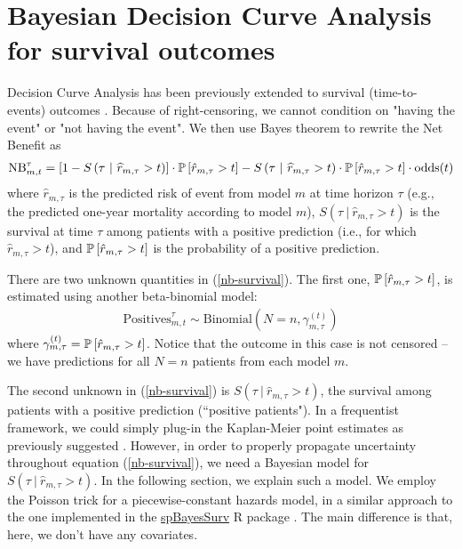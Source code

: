 \documentclass{article}
\begin{document}
\section{Bayesian Decision Curve Analysis for survival outcomes}

Decision Curve Analysis has been previously extended to survival (time-to-events) outcomes \cite{Vickers_2008}. Because of
right-censoring, we cannot condition on "having the event" or "not having the event". We then use Bayes theorem to rewrite the
Net Benefit as
\begin{align}
    \textrm{NB}^{\tau}_{m, t} = \left[1 - S\left(\tau \ | \ \widehat{r}_{m, \tau} > t \right) \right] \cdot \P\left[\hat{r}_{m, \tau} > t\right]  - S\left(\tau \ | \ \widehat{r}_{m, \tau} > t \right)  \cdot \P\left[\hat{r}_{m, \tau} > t\right] \cdot \textrm{odds}(t) \label{nb-survival}
\end{align}
where $\widehat{r}_{m, \tau}$ is the predicted risk of event from model $m$ at time horizon $\tau$ (e.g., the predicted one-year mortality according to model $m$),
$S\left(\tau \ | \ \widehat{r}_{m, \tau} > t \right)$ is the survival at time $\tau$ among patients with a positive prediction (i.e., for which $\widehat{r}_{m, \tau} > t$),
and $\P\left[\hat{r}_{m, \tau} > t\right]$ is the probability of a positive prediction. 

There are two unknown quantities in (\ref*{nb-survival}). The first one, $\P\left[\hat{r}_{m, \tau} > t\right]$, is estimated using another beta-binomial model:
\begin{align*}
    \textrm{Positives}_{m, t}^{\tau} \sim \textrm{Binomial}(N = n, \gamma_{m, \tau}^{(t)})
\end{align*}
where $\gamma_{m, \tau}^{(t)} = \P\left[\hat{r}_{m, \tau} > t\right]$. Notice that the outcome in this case is not censored -- we have predictions
for all $N=n$ patients from each model $m$. 

The second unknown in (\ref*{nb-survival}) is $S\left(\tau \ | \ \widehat{r}_{m, \tau} > t \right)$,
the survival among patients with a positive prediction (``positive patients"). 
In a frequentist framework, we could simply plug-in 
the Kaplan-Meier point estimates as previously suggested \cite{Vickers_2008}. However, in order to properly
 propagate uncertainty throughout equation (\ref*{nb-survival}),
we need a Bayesian model for $S\left(\tau \ | \ \widehat{r}_{m, \tau} > t \right)$.
In the following section, we explain such a model. We employ the Poisson trick for 
a piecewise-constant hazards model, in a similar approach to the one implemented in the
 \textcolor{blue}{\href{https://doi.org/10.18637/jss.v092.i09}{spBayesSurv}} R package \cite{Zhou_2020}.
The main difference is that, here, we don't have any covariates.
\end{document}
